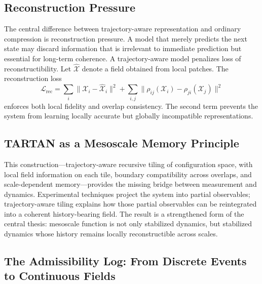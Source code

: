 \documentclass[11pt, a4paper, twocolumn]{article}
\newcommand{\X}{\mathcal{X}}
\begin{document}
\subsection{Reconstruction Pressure}

The central difference between trajectory-aware representation and ordinary
compression is reconstruction pressure. A model that merely predicts the next
state may discard information that is irrelevant to immediate prediction but
essential for long-term coherence. A trajectory-aware model penalizes loss
of reconstructibility. Let $\widehat{\X}$ denote a field obtained from local
patches. The reconstruction loss
\[
    \mathcal{L}_{\mathrm{rec}}
    =
    \sum_i
    \|\X_i - \widehat{\X}_i\|^2
    +
    \sum_{i,j}
    \|\rho_{ij}(\X_i)-\rho_{ji}(\X_j)\|^2
\]
enforces both local fidelity and overlap consistency. The second term prevents
the system from learning locally accurate but globally incompatible
representations.

\subsection{TARTAN as a Mesoscale Memory Principle}

This construction---trajectory-aware recursive tiling of configuration space,
with local field information on each tile, boundary compatibility across
overlaps, and scale-dependent memory---provides the missing bridge between
measurement and dynamics. Experimental techniques project the system into
partial observables; trajectory-aware tiling explains how those partial
observables can be reintegrated into a coherent history-bearing field. The
result is a strengthened form of the central thesis: mesoscale function is
not only stabilized dynamics, but stabilized dynamics whose history remains
locally reconstructible across scales.

\subsection{The Admissibility Log: From Discrete Events to Continuous Fields}
\end{document}
